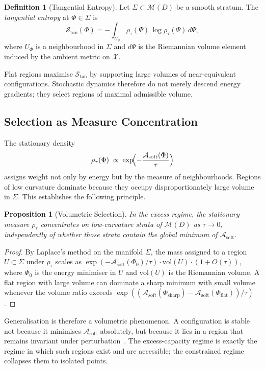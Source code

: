 \documentclass[12pt,oneside]{article}
\theoremstyle{plain}
\newtheorem{proposition}[theorem]{Proposition}
\theoremstyle{definition}
\newtheorem{definition}[theorem]{Definition}
\theoremstyle{remark}
\newcommand{\X}{\mathcal{X}}
\newcommand{\M}{\mathcal{M}}
\newcommand{\D}{D}
\newcommand{\Sig}{\Sigma}
\newcommand{\rhotau}{\rho_\tau}
\newcommand{\Asoft}{\mathcal{A}_{\mathrm{soft}}}
\begin{document}
\begin{definition}[Tangential Entropy]
Let $\Sig \subset \M(\D)$ be a smooth stratum. The \emph{tangential entropy}
at $\Phi \in \Sig$ is
\[
  \mathcal{S}_{\mathrm{tan}}(\Phi)
  = -\int_{U_\Phi} \rhotau(\Psi)\,\log\rhotau(\Psi)\,d\Psi,
\]
where $U_\Phi$ is a neighbourhood in $\Sig$ and $d\Psi$ is the Riemannian
volume element induced by the ambient metric on $\X$.
\end{definition}

Flat regions maximise $\mathcal{S}_{\mathrm{tan}}$ by supporting large volumes
of near-equivalent configurations. Stochastic dynamics therefore do not merely
descend energy gradients; they select regions of maximal admissible volume.

\subsection{Selection as Measure Concentration}

The stationary density
\[
  \rhotau(\Phi) \;\propto\; \exp\!\Bigl(-\frac{\Asoft(\Phi)}{\tau}\Bigr)
\]
assigns weight not only by energy but by the measure of neighbourhoods. Regions
of low curvature dominate because they occupy disproportionately large volume in
$\Sig$. This establishes the following principle.

\begin{proposition}[Volumetric Selection]
\label{prop:volume}
In the excess regime, the stationary measure $\rhotau$ concentrates on
low-curvature strata of $\M(\D)$ as $\tau \to 0$, independently of whether those
strata contain the global minimum of $\Asoft$.
\end{proposition}

\begin{proof}
By Laplace's method on the manifold $\Sig$, the mass assigned to a region
$U \subset \Sig$ under $\rhotau$ scales as
$\exp(-\Asoft(\Phi_0)/\tau) \cdot \mathrm{vol}(U) \cdot (1 + O(\tau))$,
where $\Phi_0$ is the energy minimiser in $U$ and $\mathrm{vol}(U)$ is the
Riemannian volume. A flat region with large volume can dominate a sharp minimum
with small volume whenever the volume ratio exceeds
$\exp((\Asoft(\Phi_{\mathrm{sharp}}) - \Asoft(\Phi_{\mathrm{flat}}))/\tau)$.
\end{proof}

Generalisation is therefore a volumetric phenomenon. A configuration is stable
not because it minimises $\Asoft$ absolutely, but because it lies in a region
that remains invariant under perturbation~\cite{Hochreiter1997,Keskar2017}. The
excess-capacity regime is exactly the regime in which such regions exist and are
accessible; the constrained regime collapses them to isolated points.
\end{document}
